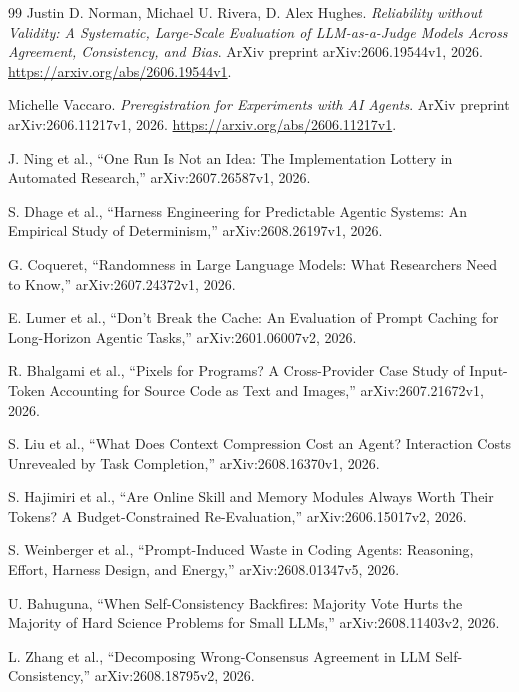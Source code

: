 \documentclass[11pt,a4paper]{article}
\begin{document}
\begin{thebibliography}{99}
Justin D. Norman, Michael U. Rivera, D. Alex Hughes.
\emph{Reliability without Validity: A Systematic, Large-Scale Evaluation of LLM-as-a-Judge Models Across Agreement, Consistency, and Bias}.
ArXiv preprint arXiv:2606.19544v1, 2026.
\url{https://arxiv.org/abs/2606.19544v1}.

Michelle Vaccaro.
\emph{Preregistration for Experiments with AI Agents}.
ArXiv preprint arXiv:2606.11217v1, 2026.
\url{https://arxiv.org/abs/2606.11217v1}.

J. Ning et al., ``One Run Is Not an Idea: The Implementation Lottery in Automated Research,'' arXiv:2607.26587v1, 2026.

S. Dhage et al., ``Harness Engineering for Predictable Agentic Systems: An Empirical Study of Determinism,'' arXiv:2608.26197v1, 2026.

G. Coqueret, ``Randomness in Large Language Models: What Researchers Need to Know,'' arXiv:2607.24372v1, 2026.

E. Lumer et al., ``Don't Break the Cache: An Evaluation of Prompt Caching for Long-Horizon Agentic Tasks,'' arXiv:2601.06007v2, 2026.

R. Bhalgami et al., ``Pixels for Programs? A Cross-Provider Case Study of Input-Token Accounting for Source Code as Text and Images,'' arXiv:2607.21672v1, 2026.

S. Liu et al., ``What Does Context Compression Cost an Agent? Interaction Costs Unrevealed by Task Completion,'' arXiv:2608.16370v1, 2026.

S. Hajimiri et al., ``Are Online Skill and Memory Modules Always Worth Their Tokens? A Budget-Constrained Re-Evaluation,'' arXiv:2606.15017v2, 2026.

S. Weinberger et al., ``Prompt-Induced Waste in Coding Agents: Reasoning, Effort, Harness Design, and Energy,'' arXiv:2608.01347v5, 2026.

U. Bahuguna, ``When Self-Consistency Backfires: Majority Vote Hurts the Majority of Hard Science Problems for Small LLMs,'' arXiv:2608.11403v2, 2026.

L. Zhang et al., ``Decomposing Wrong-Consensus Agreement in LLM Self-Consistency,'' arXiv:2608.18795v2, 2026.


\end{thebibliography}
\end{document}

